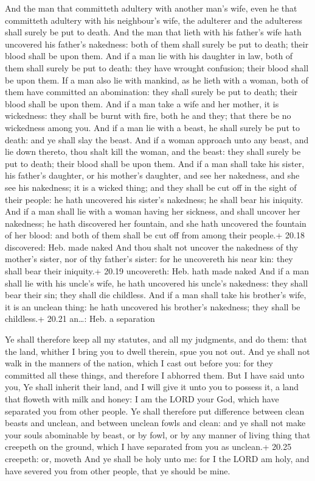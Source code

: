  And the man that committeth adultery with another man's
wife, even he that committeth adultery with his neighbour's wife, the
adulterer and the adulteress shall surely be put to death. 
And the man that lieth with his father's wife hath uncovered his
father's nakedness: both of them shall surely be put to death; their
blood shall be upon them.  And if a man lie with his
daughter in law, both of them shall surely be put to death: they have
wrought confusion; their blood shall be upon them.  If a
man also lie with mankind, as he lieth with a woman, both of them have
committed an abomination: they shall surely be put to death; their blood
shall be upon them.  And if a man take a wife and her
mother, it is wickedness: they shall be burnt with fire, both he and
they; that there be no wickedness among you.  And if a man
lie with a beast, he shall surely be put to death: and ye shall slay the
beast.  And if a woman approach unto any beast, and lie
down thereto, thou shalt kill the woman, and the beast: they shall
surely be put to death; their blood shall be upon them. 
And if a man shall take his sister, his father's daughter, or his
mother's daughter, and see her nakedness, and she see his nakedness; it
is a wicked thing; and they shall be cut off in the sight of their
people: he hath uncovered his sister's nakedness; he shall bear his
iniquity.  And if a man shall lie with a woman having her
sickness, and shall uncover her nakedness; he hath discovered her
fountain, and she hath uncovered the fountain of her blood: and both of
them shall be cut off from among their people.+ 20.18 discovered: Heb.
made naked  And thou shalt not uncover the nakedness of thy
mother's sister, nor of thy father's sister: for he uncovereth his near
kin: they shall bear their iniquity.+ 20.19 uncovereth: Heb. hath made
naked  And if a man shall lie with his uncle's wife, he
hath uncovered his uncle's nakedness: they shall bear their sin; they
shall die childless.  And if a man shall take his brother's
wife, it is an unclean thing: he hath uncovered his brother's nakedness;
they shall be childless.+ 20.21 an\ldots: Heb. a separation

 Ye shall therefore keep all my statutes, and all my
judgments, and do them: that the land, whither I bring you to dwell
therein, spue you not out.  And ye shall not walk in the
manners of the nation, which I cast out before you: for they committed
all these things, and therefore I abhorred them.  But I
have said unto you, Ye shall inherit their land, and I will give it unto
you to possess it, a land that floweth with milk and honey: I am the
LORD your God, which have separated you from other people. 
Ye shall therefore put difference between clean beasts and unclean, and
between unclean fowls and clean: and ye shall not make your souls
abominable by beast, or by fowl, or by any manner of living thing that
creepeth on the ground, which I have separated from you as unclean.+
20.25 creepeth: or, moveth  And ye shall be holy unto me:
for I the LORD am holy, and have severed you from other people, that ye
should be mine.

